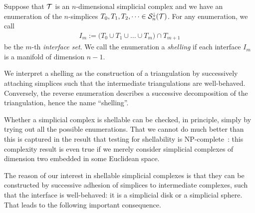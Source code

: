 \documentclass[10pt,letterpaper]{article}
\begin{document}
Suppose that ${\mathcal T}$ is an $n$-dimensional simplicial complex and we have an enumeration of the $n$-simplices $T_{0}, T_{1}, T_{2}, \dots \in {\mathcal S}^{\downarrow}_{n}({\mathcal T})$.
For any enumeration, we call 
\begin{align*}
    I_m 
    := 
    \big( 
        T_{0} \cup T_{1} \cup \dots \cup T_{m} 
    \big) 
    \cap 
    T_{m+1}
\end{align*}
be the $m$-th \textit{interface set}. 
We call the enumeration a \emph{shelling} if each interface $I_m$ is a manifold of dimension $n-1$. 

\begin{remark}
    We interpret a shelling as the construction of a triangulation 
    by successively attaching simplices such that the intermediate triangulations are well-behaved. 
    Conversely, the reverse enumeration describes a successive decomposition of the triangulation, hence the name ``shelling''.
\end{remark}
\begin{remark}
    Whether a simplicial complex is shellable can be checked, in principle, simply by trying out all the possible enumerations.
    That we cannot do much better than this is captured in the result that testing for shellability is NP-complete~\cite{goaoc2019shellability}:
    this complexity result is even true if we merely consider simplicial complexes of dimension two embedded in some Euclidean space.
\end{remark}




The reason of our interest in shellable simplicial complexes is that they can be constructed by successive adhesion of simplices to intermediate complexes, 
such that the interface is well-behaved: it is a simplicial disk or a simplicial sphere. 
That leads to the following important consequence.
\end{document}
